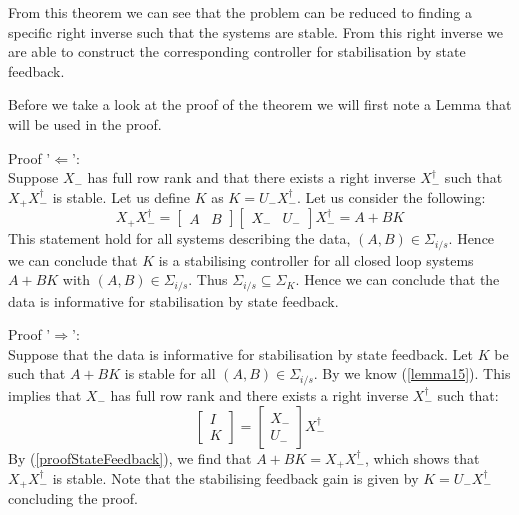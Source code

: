 From this theorem we can see that the problem can be reduced to finding a specific right inverse such that the systems are stable. From this right inverse we are able to construct the corresponding controller for stabilisation by state feedback.

Before we take a look at the proof of the theorem we will first note a Lemma that will be used in the proof.


Proof '$\Leftarrow$': \\
Suppose $X_-$ has full row rank and that there exists a right inverse $X_-^\dagger$ such that $X_+ X_-^\dagger$ is stable. Let us define $K$ as $K = U_- X_-^\dagger$. Let us consider the following:
\begin{equation} \label{proofStateFeedback}
X_+ X_-^\dagger = \begin{bmatrix}A&B\end{bmatrix} \begin{bmatrix}X_-&U_-\end{bmatrix} X_-^\dagger = A + B K
\end{equation}
This statement hold for all systems describing the data, $(A,B) \in \Sigma_{i/s}$. Hence we can conclude that $K$ is a stabilising controller for all closed loop systems $A + B K$ with $(A,B) \in \Sigma_{i/s}$. Thus $\Sigma_{i/s} \subseteq \Sigma_K$. Hence we can conclude that the data is informative for stabilisation by state feedback. 


Proof '$\Rightarrow$': \\
Suppose that the data is informative for stabilisation by state feedback. Let $K$ be such that $A+BK$ is stable for all $(A,B) \in \Sigma_{i/s}$. By \cite[Lemma 15]{waarde2019data} we know (\ref{lemma15}). This implies that $X_-$ has full row rank and there exists a right inverse $X_-^\dagger$ such that:
\[ \begin{bmatrix}I\\K \end{bmatrix} = \begin{bmatrix}X_-\\U_- \end{bmatrix}X_-^\dagger \] 
By (\ref{proofStateFeedback}), we find that $A + BK = X_+ X_-^\dagger$, which shows that $X_+ X_-^\dagger$ is stable. Note that the stabilising feedback gain is given by $K = U_- X_-^\dagger$ concluding the proof.

